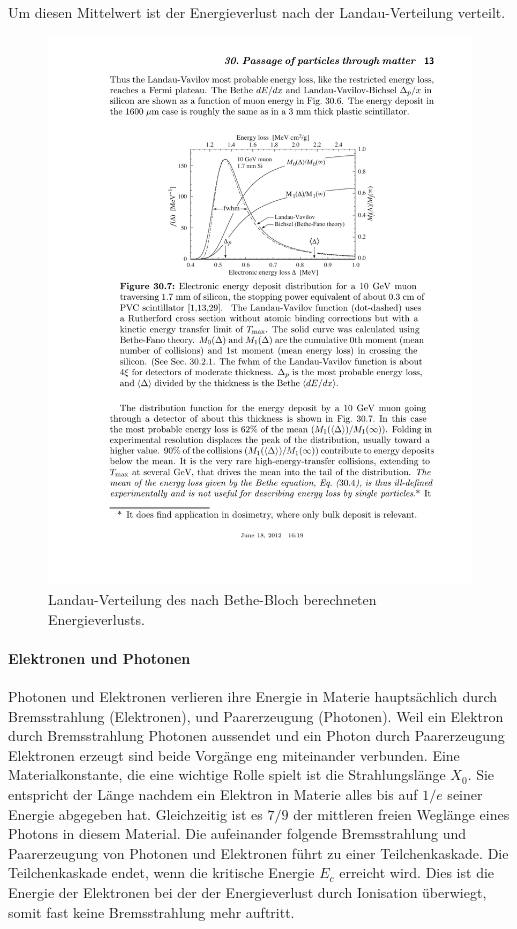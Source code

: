 Um diesen Mittelwert ist der Energieverlust nach der Landau-Verteilung verteilt.
\begin{figure}
\centering
\includegraphics[]{./input/landau.pdf}\caption{Landau-Verteilung des nach Bethe-Bloch berechneten Energieverlusts.\cite{Passage_through_matter}}\label{fig:landau}
\end{figure}
\paragraph{Elektronen und Photonen}\label{sec:emschauer}
Photonen und Elektronen verlieren ihre Energie in Materie hauptsächlich durch Bremsstrahlung (Elektronen), und Paarerzeugung (Photonen). Weil ein Elektron durch Bremsstrahlung Photonen aussendet und ein Photon durch Paarerzeugung Elektronen erzeugt sind beide Vorgänge eng miteinander verbunden. Eine Materialkonstante, die eine wichtige Rolle spielt ist die Strahlungslänge $X_0$. Sie entspricht der Länge nachdem ein Elektron in Materie alles bis auf $1/e$ seiner Energie abgegeben hat. Gleichzeitig ist es $7/9$ der mittleren freien Weglänge eines Photons in diesem Material. Die aufeinander folgende Bremsstrahlung und Paarerzeugung von Photonen und Elektronen führt zu einer Teilchenkaskade. Die Teilchenkaskade endet, wenn die kritische Energie $E_c$ erreicht wird. Dies ist die Energie der Elektronen bei der der Energieverlust durch Ionisation überwiegt, somit fast keine Bremsstrahlung mehr auftritt.

